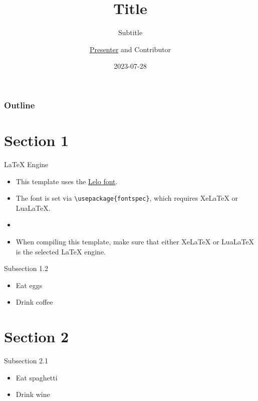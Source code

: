 \documentclass[
      10pt,
          aspectratio = 169,
  ]{beamer}
\title{Title}
\subtitle{Subtitle}
\author{\underline{Presenter} and Contributor}
\date{2023-07-28}
\institute{Institute}
\providecommand{\tightlist}{%
  \setlength{\itemsep}{0pt}\setlength{\parskip}{0pt}}
\begin{document}
  \begin{frame}[plain]{}
    \titlepage
  \end{frame}

  \begin{frame}
    \frametitle{Outline}
    \tableofcontents
  \end{frame}

\hypertarget{section-1}{%
\section{Section 1}\label{section-1}}

\begin{frame}[fragile]{LaTeX Engine}
\protect\hypertarget{latex-engine}{}
\begin{itemize}
\tightlist
\item
  This template uses the \href{https://camelot-typefaces.com/lelo}{Lelo
  font}.
\item
  The font is set via \texttt{\textbackslash{}usepackage\{fontspec\}},
  which requires XeLaTeX or LuaLaTeX.
\item
\item
  When compiling this template, make sure that either XeLaTeX or
  LuaLaTeX is the selected LaTeX engine.
\end{itemize}
\end{frame}

\begin{frame}{Subsection 1.2}
\protect\hypertarget{subsection-1.2}{}
\begin{itemize}
\tightlist
\item
  Eat eggs
\item
  Drink coffee
\end{itemize}
\end{frame}

\hypertarget{section-2}{%
\section{Section 2}\label{section-2}}

\begin{frame}{Subsection 2.1}
\protect\hypertarget{subsection-2.1}{}
\begin{itemize}
\tightlist
\item
  Eat spaghetti
\item
  Drink wine
\end{itemize}
\end{frame}
\end{document}
